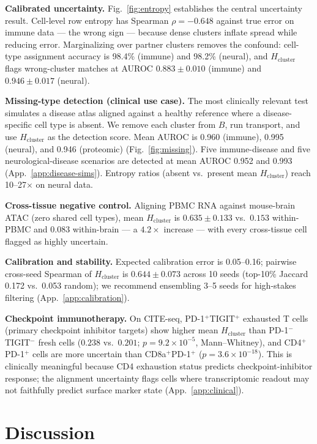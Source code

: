 \documentclass{article}
\theoremstyle{plain}
\newcommand{\Hcluster}{H_{\text{cluster}}}
\begin{document}
\textbf{Calibrated uncertainty.} Fig.~\ref{fig:entropy} establishes the central uncertainty result. Cell-level row entropy has Spearman $\rho=-0.648$ against true error on immune data --- the wrong sign --- because dense clusters inflate spread while reducing error. Marginalizing over partner clusters removes the confound: cell-type assignment accuracy is 98.4\% (immune) and 98.2\% (neural), and $\Hcluster$ flags wrong-cluster matches at AUROC $0.883\pm0.010$ (immune) and $0.946\pm0.017$ (neural).

\textbf{Missing-type detection (clinical use case).} The most clinically relevant test simulates a disease atlas aligned against a healthy reference where a disease-specific cell type is absent. We remove each cluster from $B$, run transport, and use $\Hcluster$ as the detection score. Mean AUROC is 0.960 (immune), 0.995 (neural), and 0.946 (proteomic) (Fig.~\ref{fig:missing}). Five immune-disease and five neurological-disease scenarios are detected at mean AUROC 0.952 and 0.993 (App.~\ref{app:disease-sims}). Entropy ratios (absent vs.\ present mean $\Hcluster$) reach 10--27$\times$ on neural data.

\textbf{Cross-tissue negative control.} Aligning PBMC RNA against mouse-brain ATAC (zero shared cell types), mean $\Hcluster$ is $0.635\pm 0.133$ vs.\ $0.153$ within-PBMC and $0.083$ within-brain --- a $4.2\times$ increase --- with every cross-tissue cell flagged as highly uncertain.

\textbf{Calibration and stability.} Expected calibration error is 0.05--0.16; pairwise cross-seed Spearman of $\Hcluster$ is $0.644\pm 0.073$ across 10 seeds (top-10\% Jaccard 0.172 vs.\ 0.053 random); we recommend ensembling 3--5 seeds for high-stakes filtering (App.~\ref{app:calibration}).

\textbf{Checkpoint immunotherapy.} On CITE-seq, PD-1$^+$TIGIT$^+$ exhausted T cells (primary checkpoint inhibitor targets) show higher mean $\Hcluster$ than PD-1$^-$TIGIT$^-$ fresh cells ($0.238$ vs.\ $0.201$; $p=9.2\times 10^{-5}$, Mann--Whitney), and CD4$^+$PD-1$^+$ cells are more uncertain than CD8a$^+$PD-1$^+$ ($p=3.6\times 10^{-18}$). This is clinically meaningful because CD4 exhaustion status predicts checkpoint-inhibitor response; the alignment uncertainty flags cells where transcriptomic readout may not faithfully predict surface marker state (App.~\ref{app:clinical}).

\section{Discussion}
\end{document}
